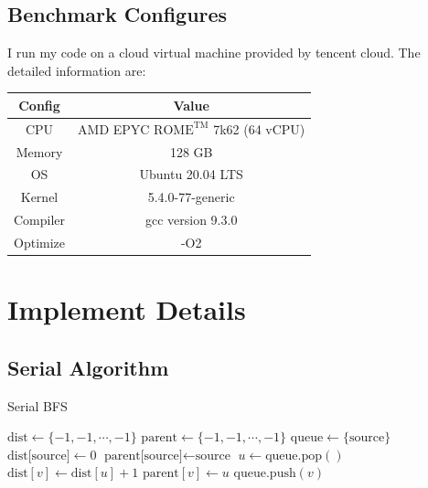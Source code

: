 \documentclass[10pt,twocolumn,letterpaper]{article}
\begin{document}
\subsection{Benchmark Configures}

I run my code on a cloud virtual machine provided by tencent cloud. The detailed information are:
\begin{table}[h]
\begin{tabular}{@{}c|c@{}}
\toprule
Config   & Value                                             \\ \midrule
CPU      & AMD EPYC $\text{ROME}^{\text{TM}}$ 7k62 (64 vCPU) \\
Memory   & 128 GB                                            \\
OS       & Ubuntu 20.04 LTS                                  \\
Kernel   & 5.4.0-77-generic                                  \\
Compiler & gcc version 9.3.0                                 \\
Optimize & -O2                                               \\ \bottomrule
\end{tabular}
\end{table}

\section{Implement Details}

\subsection{Serial Algorithm}

\begin{algorithm} 
	\caption{Serial BFS} 
	\label{sbfs} 
	\begin{algorithmic}
	    \STATE $\text{dist} \gets \{-1, -1, \cdots, -1\}$
	    \STATE $\text{parent} \gets \{-1, -1, \cdots, -1\}$
	    \STATE $\text{queue} \gets \{\text{source}\}$
	    \STATE $\text{dist[source]} \gets 0$
	    \STATE $\text{parent[source]} \gets \text{source}$
	        \STATE $u \gets \text{queue}.\text{pop}()$
	                \STATE $\text{dist}[v] \gets \text{dist}[u] + 1$
	                \STATE $\text{parent}[v] \gets u$
	                \STATE $\text{queue}.\text{push}(v)$
	            \ENDIF
	        \ENDFOR
	    \ENDWHILE
	\end{algorithmic} 
\end{algorithm}
\end{document}
